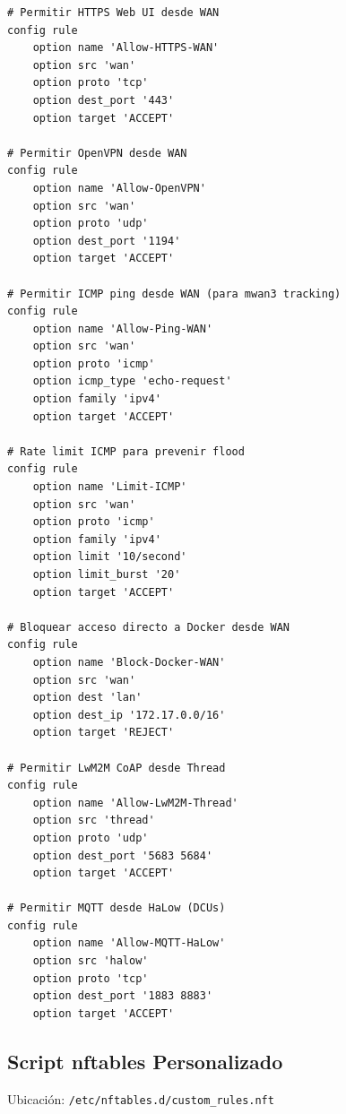 \begin{verbatim}
# Permitir HTTPS Web UI desde WAN
config rule
    option name 'Allow-HTTPS-WAN'
    option src 'wan'
    option proto 'tcp'
    option dest_port '443'
    option target 'ACCEPT'

# Permitir OpenVPN desde WAN
config rule
    option name 'Allow-OpenVPN'
    option src 'wan'
    option proto 'udp'
    option dest_port '1194'
    option target 'ACCEPT'

# Permitir ICMP ping desde WAN (para mwan3 tracking)
config rule
    option name 'Allow-Ping-WAN'
    option src 'wan'
    option proto 'icmp'
    option icmp_type 'echo-request'
    option family 'ipv4'
    option target 'ACCEPT'

# Rate limit ICMP para prevenir flood
config rule
    option name 'Limit-ICMP'
    option src 'wan'
    option proto 'icmp'
    option family 'ipv4'
    option limit '10/second'
    option limit_burst '20'
    option target 'ACCEPT'

# Bloquear acceso directo a Docker desde WAN
config rule
    option name 'Block-Docker-WAN'
    option src 'wan'
    option dest 'lan'
    option dest_ip '172.17.0.0/16'
    option target 'REJECT'

# Permitir LwM2M CoAP desde Thread
config rule
    option name 'Allow-LwM2M-Thread'
    option src 'thread'
    option proto 'udp'
    option dest_port '5683 5684'
    option target 'ACCEPT'

# Permitir MQTT desde HaLow (DCUs)
config rule
    option name 'Allow-MQTT-HaLow'
    option src 'halow'
    option proto 'tcp'
    option dest_port '1883 8883'
    option target 'ACCEPT'
\end{verbatim}

\subsection{Script nftables Personalizado}

Ubicación: \texttt{/etc/nftables.d/custom\_rules.nft}

